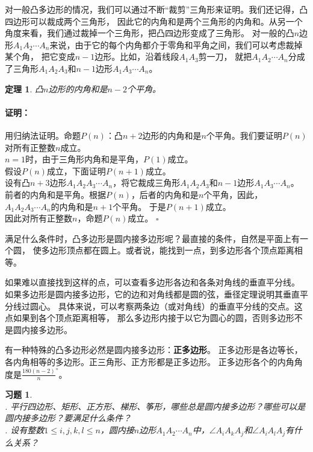 \documentclass[12pt,UTF8]{ctexbook}
\newtheorem{tm}{定理}[section]
\newtheorem{xt}{习题}[section]
\renewenvironment{proof}{\paragraph{\textbf{证明：}}}{\hfill$\square$}
\begin{document}
对一般凸多边形的情况，我们可以通过不断“裁剪”三角形来证明。我们还记得，凸四边形可以裁成两个三角形，
因此它的内角和是两个三角形的内角和。从另一个角度来看，我们通过裁掉一个三角形，把凸四边形变成了三角形。
对一般的凸$n$边形$A_1A_2\cdots A_n$来说，由于它的每个内角都介于零角和平角之间，我们可以考虑裁掉某个角，
把它变成$n-1$边形。比如，沿着线段$A_1A_3$剪一刀，
就把$A_1A_2\cdots A_n$分成了三角形$A_1A_2A_3$和$n-1$边形$A_1A_3\cdots A_n$。

\begin{tm}\label{tm:1-4-0}
    凸$n$边形的内角和是$n-2$个平角。
\end{tm}
\begin{proof}
    用归纳法证明。命题$P(n)$：凸$n+2$边形的内角和是$n$个平角。我们要证明$P(n)$对所有正整数$n$成立。\\
    $n=1$时，由于三角形内角和是平角，$P(1)$成立。\\
    假设$P(n)$成立，下面证明$P(n+1)$成立。\\
    设有凸$n+3$边形$A_1A_2A_3\cdots A_n$，将它裁成三角形$A_1A_2A_3$和$n-1$边形$A_1A_3\cdots A_n$。
    前者的内角和是平角。根据$P(n)$，后者的内角和是$n$个平角，因此，$A_1A_2A_3\cdots A_n$的内角和是$n+1$个平角。
    于是$P(n+1)$成立。\\
    因此对所有正整数$n$，命题$P(n)$成立。
\end{proof}

满足什么条件时，凸多边形是圆内接多边形呢？最直接的条件，自然是平面上有一个圆，
使多边形顶点都在圆上。或者说，能找到一点，到多边形各个顶点距离相等。

如果难以直接找到这样的点，可以查看多边形各边和各条对角线的垂直平分线。
如果多边形是圆内接多边形，它的边和对角线都是圆的弦，垂径定理说明其垂直平分线过圆心。
具体来说，可以考察两条边（或对角线）的垂直平分线的交点。这点如果到各个顶点距离相等，
那么多边形内接于以它为圆心的圆，否则多边形不是圆内接多边形。

有一种特殊的凸多边形必然是圆内接多边形：\textbf{正多边形}。
正多边形是各边等长，各内角相等的多边形。正三角形、正方形都是正多边形。
正多边形各个的内角角度是$\frac{180(n-2)}{n}^\circ$。

\begin{xt}\label{xt:1-4-0}
    \mbox{}\\
    . 平行四边形、矩形、正方形、梯形、筝形，哪些总是圆内接多边形？哪些可以是圆内接多边形？要满足什么条件？\\
    . 设有整数$1 \leqslant i,j,k,l \leqslant n$，圆内接$n$边形$A_1A_2\cdots A_n$中，$\angle A_iA_kA_j$和$\angle A_iA_lA_j$有什么关系？
\end{xt}
\end{document}
